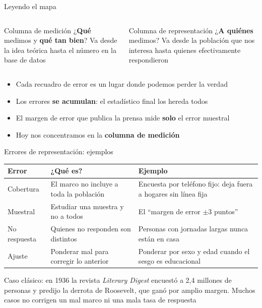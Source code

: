 \documentclass[aspectratio=169,11pt]{beamer}
\newcommand{\hl}[1]{\textcolor{marino}{\textbf{#1}}}        %
\begin{document}
\begin{frame}{Leyendo el mapa}
\begin{columns}[T]
\begin{block}{Columna de medición}
\small
¿\textbf{Qué} medimos y \textbf{qué tan bien}? Va desde la idea teórica hasta el número en la base de datos
\end{block}
\begin{exampleblock}{Columna de representación}
\small
¿\textbf{A quiénes} medimos? Va desde la población que nos interesa hasta quienes efectivamente respondieron
\end{exampleblock}
\end{columns}
\bigskip
\begin{itemize}
  \item Cada recuadro de error es un lugar donde podemos perder la verdad
  \item Los errores \textbf{se acumulan}: el estadístico final los hereda todos
  \item El margen de error que publica la prensa mide \textbf{solo} el error muestral
  \item Hoy nos concentramos en la \hl{columna de medición}
\end{itemize}
\end{frame}

\begin{frame}{Errores de representación: ejemplos}
\begin{center}
\small
\begin{tabular}{>{\raggedright}p{}>{\raggedright}p{}p{}}
\toprule
\textbf{Error} & \textbf{¿Qué es?} & \textbf{Ejemplo} \\
\midrule
\rowcolor{crema}
Cobertura & El marco no incluye a toda la población & Encuesta por teléfono fijo: deja fuera a hogares sin línea fija \\
Muestral & Estudiar una muestra y no a todos & El ``margen de error $\pm 3$ puntos'' \\
\rowcolor{crema}
No respuesta & Quienes no responden son distintos & Personas con jornadas largas nunca están en casa \\
Ajuste & Ponderar mal para corregir lo anterior & Ponderar por sexo y edad cuando el sesgo es educacional \\
\bottomrule
\end{tabular}
\end{center}
\bigskip
\footnotesize Caso clásico: en 1936 la revista \textit{Literary Digest} encuestó a 2,4 millones de personas y predijo la derrota de Roosevelt, que ganó por amplio margen. Muchos casos no corrigen un mal marco ni una mala tasa de respuesta
\end{frame}
\end{document}
